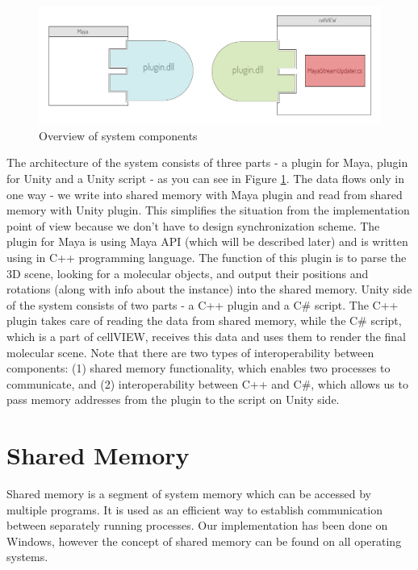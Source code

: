 \documentclass[
  digital, %
  table,   %
  nolof,     %
  nolot,     %
]{fithesis3}
\begin{document}
\begin{figure}
  \begin{center}
    \includegraphics[scale=0.8]{images/system-architecture-overview.pdf}
  \end{center}
  \caption{Overview of system components}
  \label{fig:system-overview}
\end{figure}

The architecture of the system consists of three parts - a plugin for Maya, plugin for Unity and a Unity script - as you can see in Figure \ref{fig:system-overview}.
The data flows only in one way - we write into shared memory with Maya plugin and read from shared memory with Unity plugin. This simplifies the situation from the implementation point of view because we don't have to design synchronization scheme.
The plugin for Maya is using Maya API (which will be described later) and is written using in C++ programming language. The function of this plugin is to parse the 3D scene, looking for a molecular objects, and output their positions and rotations (along with info about the instance) into the shared memory.
Unity side of the system consists of two parts - a C++ plugin and a C\# script. The C++ plugin takes care of reading the data from shared memory, while the C\# script, which is a part of cellVIEW, receives this data and uses them to render the final molecular scene. Note that there are two types of interoperability between components: (1) shared memory functionality, which enables two processes to communicate, and (2) interoperability between C++ and C\#, which allows us to pass memory addresses from the plugin to the script on Unity side.

\section{Shared Memory}
Shared memory is a segment of system memory which can be accessed by multiple programs. It is used as an efficient way to establish communication between separately running processes. Our implementation has been done on Windows, however the concept of shared memory can be found on all operating systems.
\end{document}
